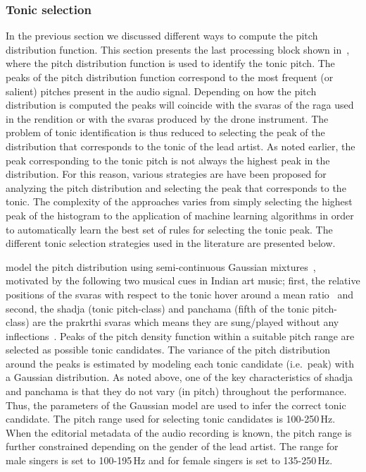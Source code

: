 \subsubsection{Tonic selection}
\label{sec:tonic_selection}

In the previous section we discussed different ways to compute the pitch distribution function. This section presents the last processing block shown in~, where the pitch distribution function is used to identify the tonic pitch. The peaks of the pitch distribution function correspond to the most frequent (or salient) pitches present in the audio signal. Depending on how the pitch distribution is computed the peaks will coincide with the \glspl{svara} of the \gls{raga} used in the rendition or with the \glspl{svara} produced by the drone instrument. The problem of tonic identification is thus reduced to selecting the peak of the distribution that corresponds to the tonic of the lead artist. As noted earlier, the peak corresponding to the tonic pitch is not always the highest peak in the distribution. For this reason, various strategies are have been proposed for analyzing the pitch distribution and selecting the peak that corresponds to the tonic. The complexity of the approaches varies from simply selecting the highest peak of the histogram to the application of machine learning algorithms in order to automatically learn the best set of rules for selecting the tonic peak. The different tonic selection strategies used in the literature are presented below.

\cite{ranjani2011carnatic} model the pitch distribution using semi-continuous Gaussian mixtures~\cite{Huang2001}, motivated by the following two musical cues in Indian art music; first, the relative positions of the \glspl{svara} with respect to the tonic hover around a mean ratio~\citep{Krishnaswamy2003} and second, the \gls{shadja} (tonic pitch-class) and \gls{panchama} (fifth of the tonic pitch-class) are the prakrthi \glspl{svara} which means they are sung/played without any inflections~\citep{Manikandan2004,Krishnaswamyicassp2003}. Peaks of the pitch density function within a suitable pitch range are selected as possible tonic candidates. The variance of the pitch distribution around the peaks is estimated by modeling each tonic candidate (i.e.~peak) with a Gaussian distribution. As noted above, one of the key characteristics of \gls{shadja} and \gls{panchama} is that they do not vary (in pitch) throughout the performance. Thus, the parameters of the Gaussian model are used to infer the correct tonic candidate. The pitch range used for selecting tonic candidates is 100-250\,Hz. When the editorial metadata of the audio recording is known, the pitch range is further constrained depending on the gender of the lead artist. The range for male singers is set to 100-195\,Hz and for female singers is set to 135-250\,Hz.

